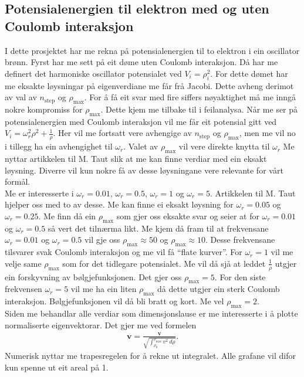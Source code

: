 \documentclass[11pt, a4paper]{article}
\begin{document}
  \subsection{Potensialenergien til elektron med og uten Coulomb interaksjon}
    I dette prosjektet har me rekna på potensialenergien til to elektron i ein oscillator brønn. Fyrst har me sett på eit døme uten Coulomb interaksjon. Då har me definert 
    det harmoniske oscillator potensialet ved $V_i = \rho_i^2$. For dette dømet har me eksakte løysningar på eigenverdiane me får frå Jacobi. Dette avheng derimot av val 
    av $n_{\text{step}}$ og $\rho_{\text{max}}$. For å få eit svar med fire siffers nøyaktighet må me inngå nokre kompromiss for $\rho_{\text{max}}$. Dette kjem me tilbake 
    til i feilanalysa. Når me ser på potensialenergien med Coulomb interaksjon vil me får eit potensial gitt ved $V_i = \omega_r^2\rho^2 + \frac{1}{\rho}$. Her vil me fortsatt vere 
    avhengige av $n_{\text{step}}$ og $\rho_{\text{max}}$, men me vil no i tillegg ha ein avhengighet til $\omega_r$. Valet av $\rho_{\text{max}}$ vil vere direkte knytta til 
    $\omega_r$ Me nyttar artikkelen til M. Taut slik at me kan finne verdiar med ein eksakt løysning. Diverre vil kun nokre få av desse løysningane vere relevante for vårt formål. \\
    Me er interesserte i $\omega_r = 0.01$, $\omega_r = 0.5$, $\omega_r = 1$ og $\omega_r = 5$. Artikkelen til M. Taut hjelper oss med to av desse. Me kan finne ei eksakt løysning 
    for $\omega_r = 0.05$ og $\omega_r = 0.25$. Me finn då ein $\rho_{\text{max}}$ som gjer oss eksakte svar og seier at for $\omega_r = 0.01$ og $\omega_r = 0.5$ så vert det 
    tilnærma likt. Me kjem då fram til at frekvensane $\omega_r = 0.01$ og $\omega_r = 0.5$ vil gje oss $\rho_{\text{max}} \approx 50$ og $\rho_{\text{max}} \approx 10$. Desse 
    frekvensane tilsvarer svak Coulomb interaksjon og me vil få ``flate kurver''. For $\omega_r = 1$ vil me velje same $\rho_{\text{max}}$ som for det tidlegare potensialet. 
    Me vil då sjå at leddet $\frac{1}{\rho}$ utgjer ein forskyvning av bølgjefunksjonen. Det gjer oss $\rho_{\text{max}} = 5$. For den siste frekvensen $\omega_r = 5$ vil me ha ein 
    liten $\rho_{\text{max}}$ då dette utgjer ein sterk Coulomb interaksjon. Bølgjefunksjonen vil då bli bratt og kort. Me vel $\rho_{\text{max}} = 2$. %
    \\
    Siden me behandlar alle verdiar som dimensjonslause er me interesserte i å plotte normaliserte eigenvektorar. Det gjer me ved formelen
    \begin{align*}
      \mathbf{v} = \frac{\mathbf{v}}{\sqrt{\int_{\rho_0}^{\rho_{\text{max}}}{v^2 \ d\rho}}}.
    \end{align*}
    Numerisk nyttar me trapesregelen for å rekne ut integralet. Alle grafane vil difor kun spenne ut eit areal på 1.
\end{document}
